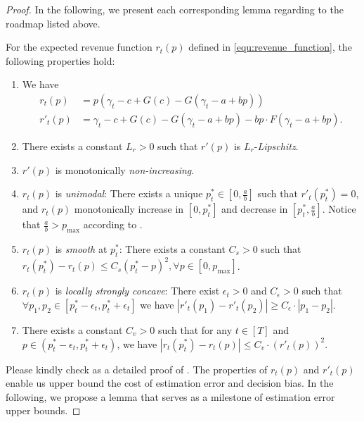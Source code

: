 \begin{proof}
In the following, we present each corresponding lemma regarding to the roadmap listed above.
\begin{lemma}
    \label{lemma:r_t_p}
    For the expected revenue function $r_t(p)$ defined in \cref{equ:revenue_function}, the following properties hold:
    \begin{enumerate}
        \item We have
        \begin{equation}
            \label{equ:r_p_and_derivatives}
            \begin{aligned}
                r_t(p) & = p(\gamma_t-c+G(c)-G(\gamma_t-a+bp))\\
                r'_t(p) & = \gamma_t-c+G(c)-G(\gamma_t-a+bp)-bp\cdot F(\gamma_t-a+bp).
            \end{aligned}
        \end{equation}
        \item There exists a constant $L_r>0$ such that $r'(p)$ is $L_r$-\emph{Lipschitz}.
        \item $r'(p)$ is monotonically \emph{non-increasing}.
        \item $r_t(p)$ is \emph{unimodal}: There exists a unique $p_t^*\in[0, \frac{a}{b}]$ such that $r'_t(p_t^*)=0$, and $r_t(p)$ monotonically increase in $[0, p_t^*]$ and decrease in $[p_t^*, \frac{a}{b}]$. Notice that $\frac{a}{b} > p_{\max}$ according to .
        \item $r_t(p)$ is \emph{smooth} at $p_t^*$: There exists a constant $C_s >0$ such that $r_t(p_t^*)-r_t(p)\leq C_s(p_t^*-p)^2, \forall p\in[0, p_{\max}]$.
        \item $r_t(p)$ is \emph{locally strongly concave}: There exist $\epsilon_t>0$ and $C_{\epsilon}>0$ such that $\forall p_1, p_2\in[p_t^*-\epsilon_t, p_t^*+\epsilon_t]$ we have $|r'_t(p_1)-r'_t(p_2)|\geq C_{\epsilon}\cdot|p_1-p_2|$.
        \item There exists a constant $C_v>0$ such that for any $t\in[T]$ and $p\in(p_t^*-\epsilon_t, p_t^*+\epsilon_t)$, we have $|r_t(p_t^*)-r_t(p)|\leq C_v\cdot(r'_t(p))^2$.
    \end{enumerate}
\end{lemma}
Please kindly check  as a detailed proof of . The properties of $r_t(p)$ and $r'_t(p)$ enable us upper bound the cost of estimation error and decision bias. In the following, we propose a lemma that serves as a milestone of estimation error upper bounds.









\end{proof}
